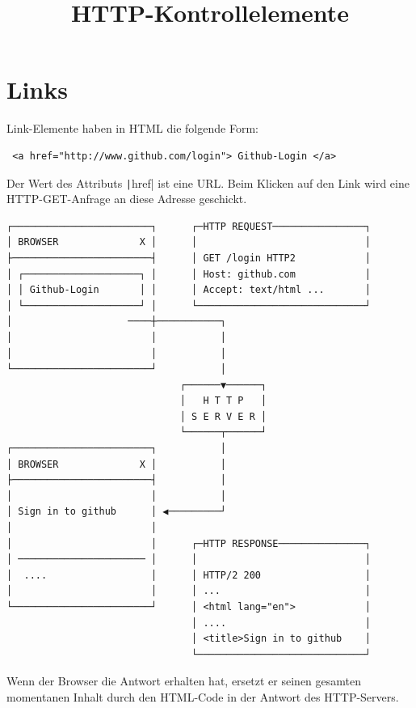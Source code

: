 \documentclass[a4paper]{scrartcl}
\date{}
\title{HTTP-Kontrollelemente}
\begin{document}
\maketitle
\section{Links}

Link-Elemente haben in HTML die folgende Form:
\begin{verbatim}
 <a href="http://www.github.com/login"> Github-Login </a> 
\end{verbatim}

Der Wert des Attributs \texttt|href| ist eine URL. Beim Klicken auf den Link wird eine HTTP-GET-Anfrage an diese Adresse geschickt.
\footnotesize
\begin{Verbatim}
┌────────────────────────┐      ┌─HTTP REQUEST────────────────┐
│ BROWSER              X │      │                             │
├────────────────────────┤      │ GET /login HTTP2            │
│ ┌────────────────────┐ │      │ Host: github.com            │
│ │ Github-Login       │ │      │ Accept: text/html ...       │
│ └────────────────────┘ │      └─────────────────────────────┘
│                    ────┼───────────┐
│                        │           │
│                        │           │
└────────────────────────┘           │
                              ┌──────▼──────┐
                              │   H T T P   │
                              │ S E R V E R │
                              └──────┬──────┘
┌────────────────────────┐           │
│ BROWSER              X │           │
├────────────────────────┤           │
│                        │           │
│ Sign in to github      │ ◀─────────┘
│                        │
│                        │      ┌─HTTP RESPONSE───────────────┐
│ ────────────────────── │      │                             │
│  ....                  │      │ HTTP/2 200                  │
│                        │      │ ...                         │
└────────────────────────┘      │ <html lang="en">            │
                                │ ....                        │
                                │ <title>Sign in to github    │
                                └─────────────────────────────┘
\end{Verbatim}

\normalsize
Wenn der Browser die Antwort erhalten hat, ersetzt er seinen gesamten momentanen Inhalt durch den HTML-Code in der Antwort des HTTP-Servers.
\end{document}
